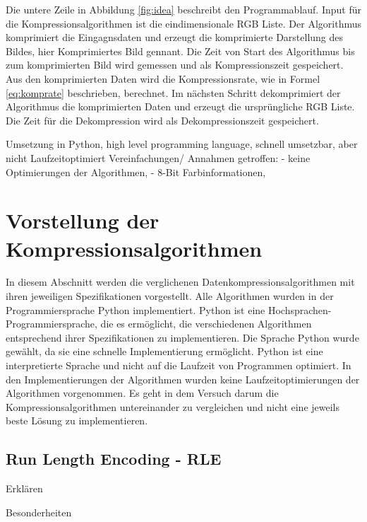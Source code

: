 \documentclass[conference]{IEEEtran}
\begin{document}
Die untere Zeile in Abbildung \ref{fig:idea} beschreibt den Programmablauf.
Input für die Kompressionsalgorithmen ist die eindimensionale RGB Liste.
Der Algorithmus komprimiert die Eingagnsdaten und erzeugt die komprimierte 
Darstellung des Bildes, hier Komprimiertes Bild gennant.
Die Zeit von Start des Algorithmus bis zum komprimierten Bild wird gemessen 
und als Kompressionszeit gespeichert.
Aus den komprimierten Daten wird die Kompressionsrate, wie in Formel \ref{eq:komprate}
beschrieben, berechnet.
Im nächsten Schritt dekomprimiert der Algorithmus die komprimierten Daten und 
erzeugt die ursprüngliche RGB Liste.
Die Zeit für die Dekompression wird als Dekompressionszeit gespeichert.









Umsetzung in Python, high level programming language, schnell umsetzbar, aber nicht
Laufzeitoptimiert
Vereinfachungen/ Annahmen getroffen:
- keine Optimierungen der Algorithmen,
- 8-Bit Farbinformationen,




\section{Vorstellung der Kompressionsalgorithmen}

In diesem Abschnitt werden die verglichenen Datenkompressionsalgorithmen 
mit ihren jeweiligen Spezifikationen vorgestellt. 
Alle Algorithmen wurden in der Programmiersprache Python implementiert. 
Python ist eine Hochsprachen-Programmiersprache, die es ermöglicht, 
die verschiedenen Algorithmen entsprechend ihrer Spezifikationen zu implementieren. 
Die Sprache Python wurde gewählt, da sie eine schnelle Implementierung ermöglicht.
Python ist eine interpretierte Sprache und nicht auf die Laufzeit von Programmen 
optimiert. \cite{nadav}
In den Implementierungen der Algorithmen wurden keine Laufzeitoptimierungen der 
Algorithmen vorgenommen.
Es geht in dem Versuch darum die Kompressionsalgorithmen untereinander zu 
vergleichen und nicht eine jeweils beste Lösung zu implementieren.


\subsection{Run Length Encoding - RLE}

Erklären

Besonderheiten
\end{document}
